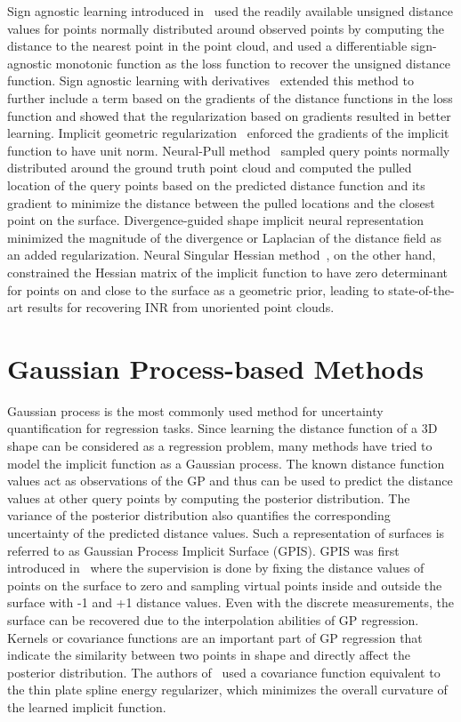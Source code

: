 Sign agnostic learning introduced in~\cite{SAL} used the readily available unsigned distance values for points normally distributed around observed points by computing the distance to the nearest point in the point cloud, and used a differentiable sign-agnostic monotonic function as the loss function to recover the unsigned distance function. Sign agnostic learning with derivatives~\cite{SALD} extended this method to further include a term based on the gradients of the distance functions in the loss function and showed that the regularization based on gradients resulted in better learning. Implicit geometric regularization~\cite{IGR} enforced the gradients of the implicit function to have unit norm. Neural-Pull method~\cite{NeuralPull} sampled query points normally distributed around the ground truth point cloud and computed the pulled location of the query points based on the predicted distance function and its gradient to minimize the distance between the pulled locations and the closest point on the surface. Divergence-guided shape implicit neural representation~\cite{DiGS} minimized the magnitude of the divergence or Laplacian of the distance field as an added regularization. Neural Singular Hessian method~\cite{NeuralHessian}, on the other hand, constrained the Hessian matrix of the implicit function to have zero determinant for points on and close to the surface as a geometric prior, leading to state-of-the-art results for recovering INR from unoriented point clouds.


\section{Gaussian Process-based Methods}\label{Stoch-old}
Gaussian process is the most commonly used method for uncertainty quantification for regression tasks. Since learning the distance function of a 3D shape can be considered as a regression problem, many methods have tried to model the implicit function as a Gaussian process. The known distance function values act as observations of the GP and thus can be used to predict the distance values at other query points by computing the posterior distribution. The variance of the posterior distribution also quantifies the corresponding uncertainty of the predicted distance values. Such a representation of surfaces is referred to as Gaussian Process Implicit Surface (GPIS). GPIS was first introduced in~\cite{GPIS} where the supervision is done by fixing the distance values of points on the surface to zero and sampling virtual points inside and outside the surface with -1 and +1 distance values. Even with the discrete measurements, the surface can be recovered due to the interpolation abilities of GP regression. Kernels or covariance functions are an important part of GP regression that indicate the similarity between two points in shape and directly affect the posterior distribution. The authors of~\cite{GPIS} used a covariance function equivalent to the thin plate spline energy regularizer, which minimizes the overall curvature of the learned implicit function. 
\newline

